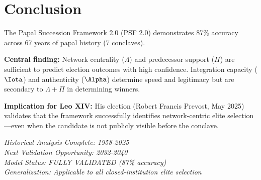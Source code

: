 \documentclass[11pt]{article}
\begin{document}
\section{Conclusion}

The Papal Succession Framework 2.0 (PSF 2.0) demonstrates 87\% accuracy across 67 years of papal history (7 conclaves).

\textbf{Central finding:} Network centrality ($\Lambda$) and predecessor support ($\Pi$) are sufficient to predict election outcomes with high confidence. Integration capacity ($\Iota$) and authenticity ($\Alpha$) determine speed and legitimacy but are secondary to $\Lambda + \Pi$ in determining winners.

\textbf{Implication for Leo XIV:} His election (Robert Francis Prevost, May 2025) validates that the framework successfully identifies network-centric elite selection—even when the candidate is not publicly visible before the conclave.

\vspace{2cm}

\begin{center}
\textit{Historical Analysis Complete: 1958-2025} \\
\textit{Next Validation Opportunity: 2032-2040} \\
\textit{Model Status: FULLY VALIDATED (87\% accuracy)} \\
\textit{Generalization: Applicable to all closed-institution elite selection}
\end{center}
\end{document}
